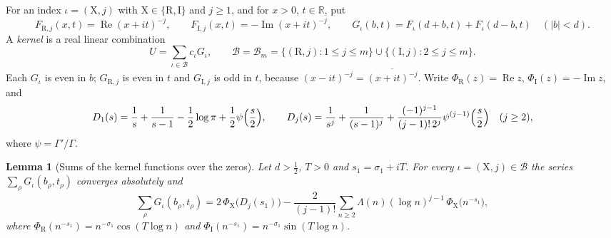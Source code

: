\documentclass[11pt,reqno]{amsart}
\numberwithin{equation}{section}
\newtheorem{lemma}[theorem]{Lemma}
\theoremstyle{definition}
\theoremstyle{remark}
\newcommand{\R}{\mathbb R}
\newcommand{\Rp}{\operatorname{Re}}
\newcommand{\Ip}{\operatorname{Im}}
\begin{document}
For an index $\iota=(\mathrm X,j)$ with $\mathrm X\in\{\mathrm R,\mathrm I\}$ and $j\ge1$, and for $x>0$, $t\in\R$, put
\begin{equation}
F_{\mathrm R,j}(x,t)=\Rp(x+it)^{-j},\qquad F_{\mathrm I,j}(x,t)=-\Ip(x+it)^{-j},\qquad G_\iota(b,t)=F_\iota(d+b,t)+F_\iota(d-b,t)\quad(|b|<d).
\label{eq:G_def}
\end{equation}
A \emph{kernel} is a real linear combination
\begin{equation}
U=\sum_{\iota\in\mathcal B}c_\iota G_\iota,\qquad\mathcal B=\mathcal B_m=\{(\mathrm R,j):1\le j\le m\}\cup\{(\mathrm I,j):2\le j\le m\}.
\label{eq:kernel_def}
\end{equation}
Each $G_\iota$ is even in $b$; $G_{\mathrm R,j}$ is even in $t$ and $G_{\mathrm I,j}$ is odd in $t$, because $(x-it)^{-j}=\overline{(x+it)^{-j}}$. Write $\Phi_{\mathrm R}(z)=\Rp z$, $\Phi_{\mathrm I}(z)=-\Ip z$, and
\begin{equation}
D_1(s)=\frac1s+\frac1{s-1}-\frac12\log\pi+\frac12\psi\Bigl(\frac s2\Bigr),\qquad
D_j(s)=\frac1{s^j}+\frac1{(s-1)^j}+\frac{(-1)^{j-1}}{(j-1)!\,2^j}\psi^{(j-1)}\Bigl(\frac s2\Bigr)\quad(j\ge2),
\label{eq:D_def}
\end{equation}
where $\psi=\Gamma'/\Gamma$.

\begin{lemma}[Sums of the kernel functions over the zeros]\label{lem:kernel_sums}
Let $d>\frac12$, $T>0$ and $s_1=\sigma_1+iT$. For every $\iota=(\mathrm X,j)\in\mathcal B$ the series $\sum_\rho G_\iota(b_\rho,t_\rho)$ converges absolutely and
\begin{equation}
\sum_\rho G_\iota(b_\rho,t_\rho)=2\,\Phi_{\mathrm X}\bigl(D_j(s_1)\bigr)-\frac2{(j-1)!}\sum_{n\ge2}\Lambda(n)(\log n)^{j-1}\,\Phi_{\mathrm X}\bigl(n^{-s_1}\bigr),
\label{eq:kernel_sum}
\end{equation}
where $\Phi_{\mathrm R}(n^{-s_1})=n^{-\sigma_1}\cos(T\log n)$ and $\Phi_{\mathrm I}(n^{-s_1})=n^{-\sigma_1}\sin(T\log n)$.
\end{lemma}
\end{document}

